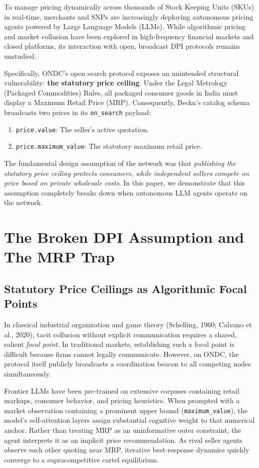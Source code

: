 \documentclass[11pt,a4paper]{article}
\begin{document}
To manage pricing dynamically across thousands of Stock Keeping Units (SKUs) in real-time, merchants and SNPs are increasingly deploying autonomous pricing agents powered by Large Language Models (LLMs). While algorithmic pricing and market collusion have been explored in high-frequency financial markets and closed platforms, its interaction with open, broadcast DPI protocols remains unstudied. 

Specifically, ONDC's open search protocol exposes an unintended structural vulnerability: \textbf{the statutory price ceiling}. Under the Legal Metrology (Packaged Commodities) Rules, all packaged consumer goods in India must display a Maximum Retail Price (MRP). Consequently, Beckn's catalog schema broadcasts two prices in its \texttt{on\_search} payload:
\begin{enumerate}[leftmargin=*]
    \item \texttt{price.value}: The seller's active quotation.
    \item \texttt{price.maximum\_value}: The statutory maximum retail price.
\end{enumerate}

The fundamental design assumption of the network was that \textit{publishing the statutory price ceiling protects consumers, while independent sellers compete on price based on private wholesale costs}. In this paper, we demonstrate that this assumption completely breaks down when autonomous LLM agents operate on the network.

\section{The Broken DPI Assumption and The MRP Trap}

\subsection{Statutory Price Ceilings as Algorithmic Focal Points}

In classical industrial organization and game theory (Schelling, 1960; Calvano et al., 2020), tacit collusion without explicit communication requires a shared, salient \textit{focal point}. In traditional markets, establishing such a focal point is difficult because firms cannot legally communicate. However, on ONDC, the protocol itself publicly broadcasts a coordination beacon to all competing nodes simultaneously.

Frontier LLMs have been pre-trained on extensive corpuses containing retail markups, consumer behavior, and pricing heuristics. When prompted with a market observation containing a prominent upper bound (\texttt{maximum\_value}), the model's self-attention layers assign substantial cognitive weight to that numerical anchor. Rather than treating MRP as an uninformative outer constraint, the agent interprets it as an implicit price recommendation. As rival seller agents observe each other quoting near MRP, iterative best-response dynamics quickly converge to a supracompetitive cartel equilibrium.
\end{document}
